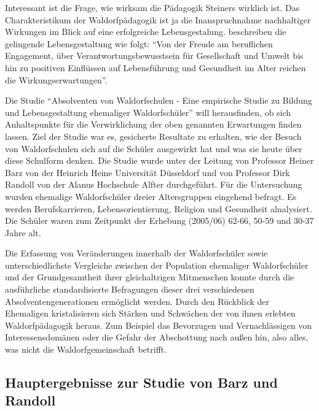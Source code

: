 
Interessant ist die Frage, wie wirksam die Pädagogik Steiners wirklich ist. Das Charakteristikum der Waldorfpädagogik ist ja die Inanspruchnahme nachhaltiger Wirkungen im Blick auf eine erfolgreiche Lebensgestalung. \citet[][S. 13]{randoll07} beschreiben die gelingende Lebensgestaltung wie folgt: \enquote{Von der Freude am beruflichen Engagement, über Verantwortungsbewusstsein für Gesellschaft und Umwelt bis hin zu positiven Einflüssen auf Lebensführung und Gesundheit im Alter reichen die Wirkungserwartungen}.

Die Studie \enquote{Absolventen von Waldorfschulen - Eine empirische Studie zu Bildung und Lebensgestaltung ehemaliger Waldorfschüler} will herausfinden, ob sich Anhaltspunkte für die Verwirklichung der oben genannten Erwartungen finden lassen. Ziel der Studie war es, gesicherte Resultate zu erhalten, wie der Besuch von Waldorfschulen sich auf die Schüler ausgewirkt hat und was sie heute über diese Schulform denken. Die Studie wurde unter der Leitung von Professor Heiner Barz von der Heinrich Heine Universität Düsseldorf und von Professor Dirk Randoll von der Alanus Hochschule Alfter durchgeführt. Für die Untersuchung wurden ehemalige Waldorfschüler dreier Altersgruppen eingehend befragt. Es werden Berufskarrieren, Lebensorientierung, Religion und Gesundheit alnalysiert. Die Schüler waren zum Zeitpunkt der Erhebung (2005/06) 62-66, 50-59 und 30-37 Jahre alt.   \citep[Vgl.][]{randoll07, paschen10}

Die Erfassung von Veränderungen innerhalb der Waldorfschüler sowie unterschiedlichste Vergleiche zwischen der Population ehemaliger Waldorfschüler und der Grundgesamtheit ihrer gleichaltrigen Mitmenschen konnte durch die ausführliche standardisierte Befragungen dieser drei verschiedenen Absolventengenerationen ermöglicht werden. Durch den Rückblick der Ehemaligen kristalisieren sich Stärken und Schwächen der von ihnen erlebten Waldorfpädagogik heraus. Zum Beispiel das Bevorzugen und Vernachlässigen von Interessensdomänen oder die Gefahr der Abschottung nach außen hin, also alles, was nicht die Waldorfgemeinschaft betrifft.  \citep[Vgl.][S. 12]{randoll07}

\subsection{Hauptergebnisse zur Studie von Barz und Randoll} %
\label{sub:hauptergebnisse}


